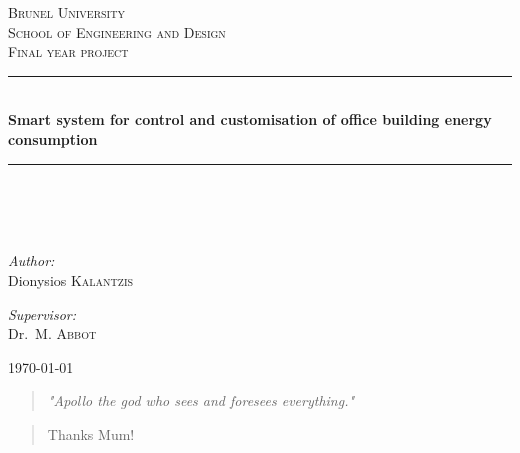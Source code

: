 \documentclass[12pt,a4paper]{report}
\author{Student: Dionisios Kalantzis (SID:0733139) \\ Supervisor: Dr. Maysam Abbod}
\begin{document}
\onehalfspacing
\begin{titlepage}
\begin{center}
%
\textsc{\LARGE Brunel University}\\[1.5cm]
\textsc{\LARGE School of Engineering and Design}\\[1cm]
%
\textsc{\Large Final year project}\\[1cm]
\hrule
\hfill\\[0.5cm]
{ \huge \bfseries Smart system for control and customisation of office building energy consumption}\\[0.5cm]
\hrule
\hfill\\[0.5cm]
\ \\
\hfill\\[0.2cm]
\begin{minipage}{0.4\textwidth}
\begin{flushleft} \large
\emph{Author:}\\
Dionysios \textsc{Kalantzis}
\end{flushleft}
\end{minipage}
\begin{minipage}{0.4\textwidth}
\begin{flushright} \large
\emph{Supervisor:} \\
Dr.~M. \textsc{Abbot}
\end{flushright}
\end{minipage}
\vfill
{\large \today}
\end{center}
\end{titlepage}
\newpage
%
\newpage
\begin{abstract}
\emph{"Apollo the god who sees and foresees everything."}
\end{abstract}
%
\renewcommand{\abstractname}{Acknowledgements}
\begin{abstract}
 Thanks Mum!
\end{abstract}
%
\newpage
\tableofcontents
\newpage
\listoffigures
%
\pagestyle{fancyplain}
\fancyhf{}
\lhead{\fancyplain{}{\leftmark}}
\rhead{\fancyplain{}{}}
\rfoot{\fancyplain{}{\thepage}}
%
\end{document}
